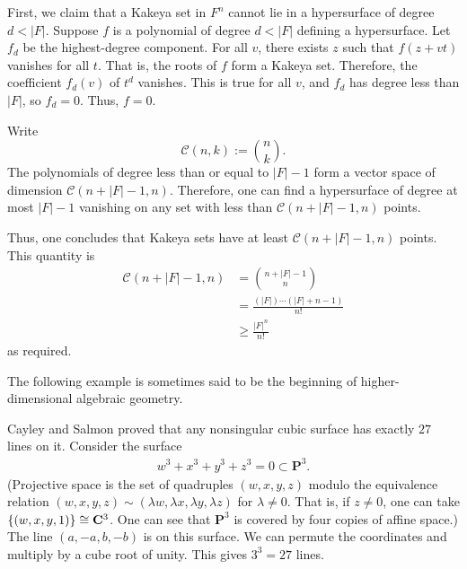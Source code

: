 \documentclass [11 pt, oneside] {article}
\begin{document}
First, we claim that a Kakeya set in $F^n$ cannot lie in a hypersurface of degree $d<\left\lvert F \right\rvert $. Suppose $f$ is a polynomial of degree $d<\left\lvert F \right\rvert $ defining a hypersurface. Let $f_d$ be the highest-degree component. For all $v$, there exists $z$ such that $f(z+vt)$ vanishes for all $t$. That is, the roots of $f$ form a Kakeya set. Therefore, the coefficient $f_d(v)$ of $t^d$ vanishes. This is true for all $v$, and $f_d$ has degree less than $\left\lvert F \right\rvert $, so $f_d=0$. Thus, $f=0$.

Write 
\[
	\mathscr{C}(n,k) := \binom{n}{k}.
\]
The polynomials of degree less than or equal to $\left\lvert F \right\rvert -1$ form a vector space of dimension $\mathscr{C} ({n+\left\lvert F \right\rvert -1},{n})$. Therefore, one can find a hypersurface of degree at most $\left\lvert F \right\rvert -1$ vanishing on any set with less than $\mathscr{C}({n+\left\lvert F \right\rvert -1},{n})$ points.

Thus, one concludes that Kakeya sets have at least $\mathscr{C}({n+\left\lvert F \right\rvert -1},{n})$ points. This quantity is 
\begin{align*}
	\mathscr{C}({n+\left\lvert F \right\rvert -1},{n}) &=\binom{n+\left\lvert F \right\rvert -1}{n}\\
	&= \frac{(\left\lvert F \right\rvert ) \cdots (\left\lvert F \right\rvert +n-1)}{n!} \\
	&\ge \frac{\left\lvert F \right\rvert ^n}{n!}
\end{align*}
as required.

The following example is sometimes said to be the beginning of higher-dimensional algebraic geometry.

\begin{example}\label{}
Cayley and Salmon proved that any nonsingular cubic surface has exactly $27$ lines on it. Consider the surface
\begin{align*}
	w^3 + x^3 +y^3 + z^3 = 0 \subset \mathbf{P}^3.
\end{align*}
(Projective space is the set of quadruples $(w,x,y,z)$ modulo the equivalence relation $(w,x,y,z)\sim  (\lambda w, \lambda x, \lambda y,\lambda z)$ for $\lambda\ne 0$. That is, if $z\ne 0$, one can take $\{(w,x,y,1)\} \cong  \mathbf{C}^3$. One can see that $\mathbf{P}^3$ is covered by four copies of affine space.) The line $(a,-a,b,-b)$ is on this surface. We can permute the coordinates and multiply by a cube root of unity. This gives $3^3 = 27$ lines.  
\end{example}
\end{document}
